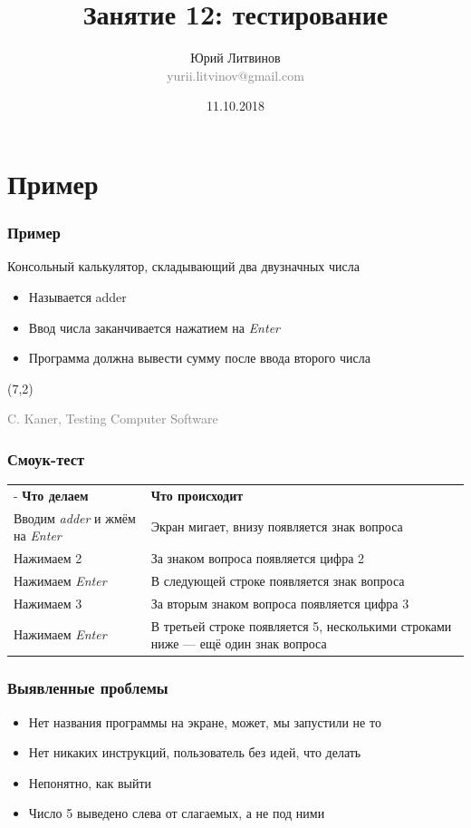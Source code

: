 \documentclass[xetex,mathserif,serif]{beamer}
\title{Занятие 12: тестирование}
\author[Юрий Литвинов]{Юрий Литвинов\\\small{\textcolor{gray}{yurii.litvinov@gmail.com}}}
\date{11.10.2018}
\newcommand{\attribution}[1] {
	\begin{flushright}\begin{scriptsize}\textcolor{gray}{\textcopyright\; #1}\end{scriptsize}\end{flushright}
}
\begin{document}
	\frame{\titlepage}

	\section{Пример}

	\begin{frame}
		\frametitle{Пример}
		Консольный калькулятор, складывающий два двузначных числа
		\begin{itemize}
			\item Называется adder
			\item Ввод числа заканчивается нажатием на \textit{Enter}
			\item Программа должна вывести сумму после ввода второго числа
		\end{itemize}
		\begin{textblock}{5}(7,2)
			\attribution{C. Kaner, Testing Computer Software}
		\end{textblock}
	\end{frame}

	\begin{frame}
		\frametitle{Смоук-тест}
		\begin{center}
			\begin{tabu} {| X[0.6 l p] | X[1 l p] |}
				\tabucline-
				\everyrow{\tabucline-}
				\textbf{Что делаем}                             & \textbf{Что происходит}                                                            \\
				Вводим \textit{adder} и жмём на \textit{Enter}  & Экран мигает, внизу появляется знак вопроса                                        \\
				Нажимаем 2                                      & За знаком вопроса появляется цифра 2                                               \\
				Нажимаем \textit{Enter}                         & В следующей строке появляется знак вопроса                                         \\
				Нажимаем 3                                      & За вторым знаком вопроса появляется цифра 3                                        \\
				Нажимаем \textit{Enter}                         & В третьей строке появляется 5, несколькими строками ниже --- ещё один знак вопроса
			\end{tabu}
		\end{center}
	\end{frame}

	\begin{frame}
		\frametitle{Выявленные проблемы}
		\begin{itemize}
			\item Нет названия программы на экране, может, мы запустили не то
			\item Нет никаких инструкций, пользователь без идей, что делать
			\item Непонятно, как выйти
			\item Число 5 выведено слева от слагаемых, а не под ними
		\end{itemize}
	\end{frame}
\end{document}
